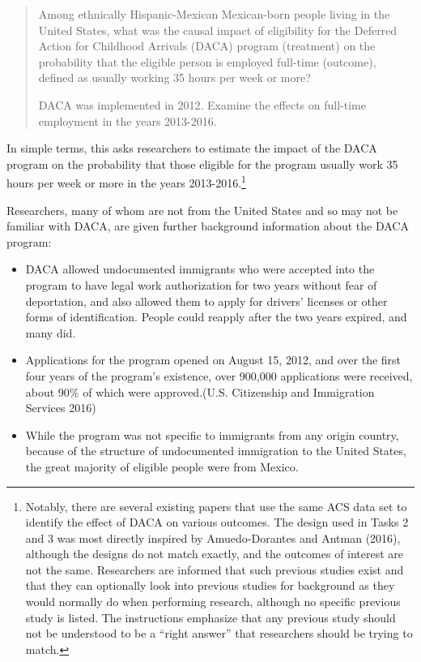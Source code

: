 \documentclass[
  letterpaper,
  DIV=11,
  numbers=noendperiod]{scrartcl}
\begin{document}
\begin{quote}
Among ethnically Hispanic-Mexican Mexican-born people living in the
United States, what was the causal impact of eligibility for the
Deferred Action for Childhood Arrivals (DACA) program (treatment) on the
probability that the eligible person is employed full-time (outcome),
defined as usually working 35 hours per week or more?

DACA was implemented in 2012. Examine the effects on full-time
employment in the years 2013-2016.
\end{quote}

In simple terms, this asks researchers to estimate the impact of the
DACA program on the probability that those eligible for the program
usually work 35 hours per week or more in the years
2013-2016.\footnote{Notably, there are several existing papers that use
  the same ACS data set to identify the effect of DACA on various
  outcomes. The design used in Tasks 2 and 3 was most directly inspired
  by Amuedo-Dorantes and Antman (2016), although the designs do not
  match exactly, and the outcomes of interest are not the same.
  Researchers are informed that such previous studies exist and that
  they can optionally look into previous studies for background as they
  would normally do when performing research, although no specific
  previous study is listed. The instructions emphasize that any previous
  study should not be understood to be a ``right answer'' that
  researchers should be trying to match.}

Researchers, many of whom are not from the United States and so may not
be familiar with DACA, are given further background information about
the DACA program:

\begin{itemize}
\item
  DACA allowed undocumented immigrants who were accepted into the
  program to have legal work authorization for two years without fear of
  deportation, and also allowed them to apply for drivers' licenses or
  other forms of identification. People could reapply after the two
  years expired, and many did.
\item
  Applications for the program opened on August 15, 2012, and over the
  first four years of the program's existence, over 900,000 applications
  were received, about 90\% of which were approved.(U.S. Citizenship and
  Immigration Services 2016)
\item
  While the program was not specific to immigrants from any origin
  country, because of the structure of undocumented immigration to the
  United States, the great majority of eligible people were from Mexico.
\end{itemize}
\end{document}
